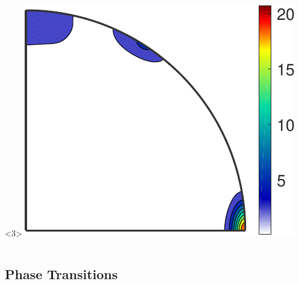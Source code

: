 \documentclass[compress]{beamer}
\begin{document}
\begin{frame}[fragile]
\begin{columns}
\begin{column}{4cm}
\begin{overlayarea}{\textwidth}{8cm}
    \medskip

    \begin{onlyenv}<3>
      \includegraphics[width = \textwidth]{pic/axisDistriSmooth}
    \end{onlyenv}
  \end{overlayarea}

\end{column}

\end{columns}

\end{frame}


\subsection*{Phase Transitions}
\end{document}
